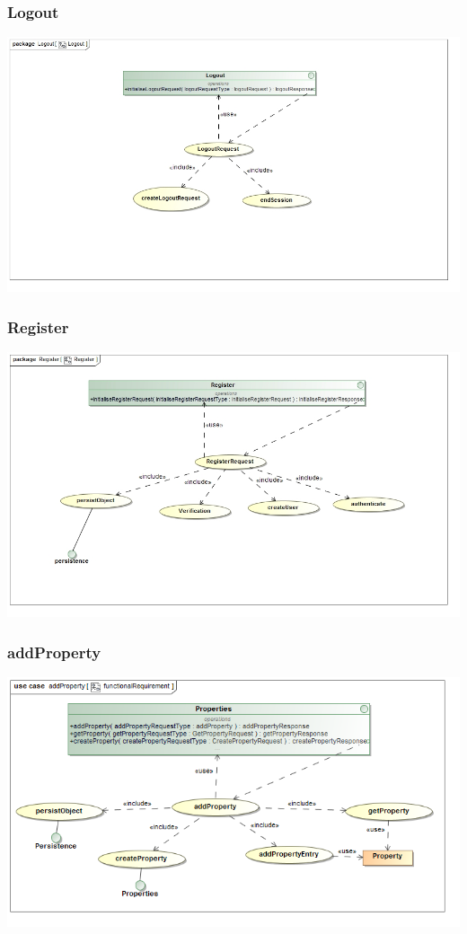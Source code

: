 \documentclass[a4paper,12pt]{article}
\begin{document}
\subsubsection{Logout}
\includegraphics[width=1\textwidth]{./Images/processSpecification/Priscilla/Logout.jpg}
\subsubsection{Register}
\includegraphics[width=1\textwidth]{./Images/processSpecification/Priscilla/Register.jpg}

\subsubsection{addProperty}
\includegraphics[width=1\textwidth]{./Images/requiredFunctionality/addProperty.png}
\end{document}
